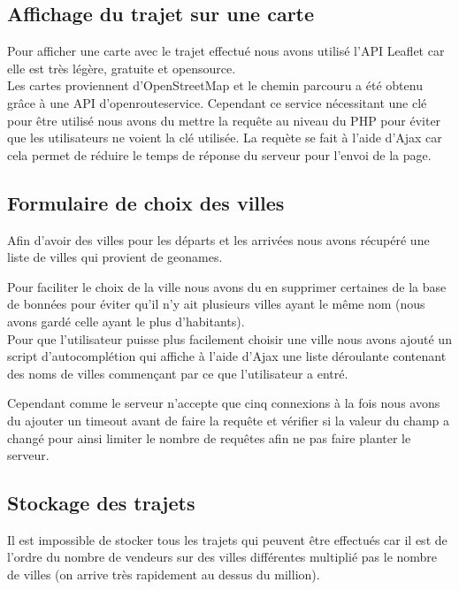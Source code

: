 \documentclass{article}
\begin{document}
    \subsection{Affichage du trajet sur une carte}
        Pour afficher une carte avec le trajet effectué nous avons utilisé l'API Leaflet car elle est très légère, gratuite et opensource.
        \\
        
        Les cartes proviennent d'OpenStreetMap et le chemin parcouru a été obtenu grâce à une API d'openrouteservice. Cependant ce service nécessitant une clé pour être utilisé nous avons du mettre la requête au niveau du PHP pour éviter que les utilisateurs ne voient la clé utilisée.
        La requète se fait à l'aide d'Ajax car cela permet de réduire le temps de réponse du serveur pour l'envoi de la page.
    
    \subsection{Formulaire de choix des villes}
        Afin d'avoir des villes pour les départs et les arrivées nous avons récupéré une liste de villes qui provient de geonames.
        
        Pour faciliter le choix de la ville nous avons du en supprimer certaines de la base de bonnées pour éviter qu'il n'y ait plusieurs villes ayant le même nom (nous avons gardé celle ayant le plus d'habitants).
        \\
        
        Pour que l'utilisateur puisse plus facilement choisir une ville nous avons ajouté un script d'autocomplétion qui affiche à l'aide d'Ajax une liste déroulante contenant des noms de villes commençant par ce que l'utilisateur a entré.
        
        Cependant comme le serveur n'accepte que cinq connexions à la fois nous avons du ajouter un timeout avant de faire la requête et vérifier si la valeur du champ a changé pour ainsi limiter le nombre de requêtes afin ne pas faire planter le serveur.
    
    \subsection{Stockage des trajets}
        Il est impossible de stocker tous les trajets qui peuvent être effectués car il est de l'ordre du nombre de vendeurs sur des villes différentes multiplié pas le nombre de villes (on arrive très rapidement au dessus du million). 
        \\
        
\end{document}
